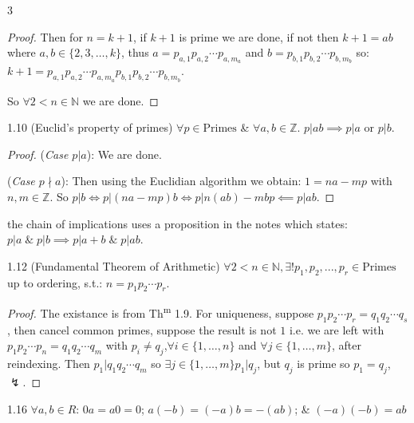 \documentclass[8pt]{extarticle}
\begin{document}
\begin{multicols}{3}
\begin{proof}
            Then for \(n=k+1\), if \(k+1\) is prime we are done, if not then \(k+1=ab\) where \(a,b\in\{2,3,\ldots,k\}\), thus \(a=p_{a,1}p_{a,2}\cdots p_{a,m_a}\) and \(b=p_{b,1}p_{b,2}\cdots p_{b,m_b}\) so: \(k+1=p_{a,1}p_{a,2}\cdots p_{a,m_a}p_{b,1}p_{b,2}\cdots p_{b,m_b}\).

            So \(\forall 2<n\in\mathbb{N}\) we are done.

        \end{proof}

        \begin{theorem}{1.10}
            (Euclid's property of primes) \(\forall p\in \text{Primes}\) \& \(\forall a,b\in\mathbb{Z}\). \(p|ab\implies p|a\text{ or } p|b\).
        \end{theorem}

        \begin{proof}
            (\textit{Case \(p|a\)}): We are done.

            (\textit{Case \(p\nmid a\)}): Then using the Euclidian algorithm we obtain: \(1=na-mp\) with \(n,m\in\mathbb{Z}\).
            So \(p|b\Longleftrightarrow p|(na-mp)b\Longleftrightarrow p|n(ab)-mbp\impliedby p|ab\).
        \end{proof}

        {\footnotesize the chain of implications uses a proposition in the notes which states: \(p|a\;\&\;p|b\implies p|a+b\;\&\;p|ab\)}.

        \begin{theorem}{1.12}
            (Fundamental Theorem of Arithmetic) \(\forall 2<n\in\mathbb{N},\exists! p_1,p_2,...,p_r\in\text{Primes}\) up to ordering, s.t.: \(n=p_1p_2\cdots p_r\).
        \end{theorem}

        \begin{proof}
            The existance is from Th\textsuperscript{m} 1.9. For uniqueness, suppose \(p_1p_2\cdots p_r=q_1q_2\cdots q_s\), then cancel common primes, suppose the result is not \(1\) i.e. we are left with \(p_1p_2\cdots p_n=q_1q_2\cdots q_m\) with \(p_i\ne q_j\),\(\forall i\in\{1,\ldots,n\}\) and \(\forall j\in\{1,\ldots,m\}\), after reindexing. Then \(p_1|q_1q_2\cdots q_m\) so \(\exists j\in\{1,\ldots,m\}\)\(p_1|q_j\), but \(q_j\) is prime so \(p_1=q_j\), \(\lightning\).
        \end{proof}

        \begin{lemma}{1.16}
            \(\forall a,b\in R\): \(0a=a0=0\); \(a(-b)=(-a)b=-(ab)\); \& \((-a)(-b)=ab\)
        \end{lemma}


\end{multicols}
\end{document}
